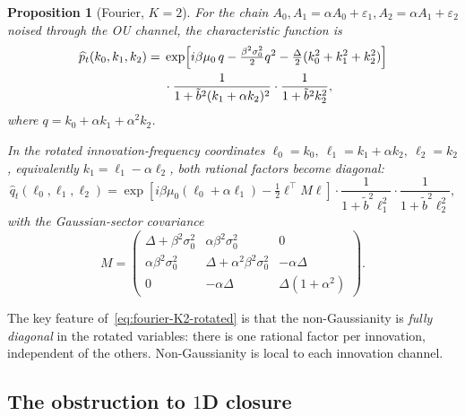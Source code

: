 \documentclass[11pt,a4paper]{article}
\theoremstyle{plainserif}
\newtheorem{proposition}[theorem]{Proposition}
\theoremstyle{definition}
\theoremstyle{remarkstyle}
\newcommand{\btilde}{\tilde{b}}
\newcommand{\hatfn}[1]{\widehat{#1}}
\begin{document}
\begin{proposition}[Fourier, $K{=}2$]
\label{prop:fourier-K2}
For the chain $A_0, A_1 = \alpha A_0+\varepsilon_1, A_2 = \alpha A_1+\varepsilon_2$
noised through the OU channel, the characteristic function is
\begin{align}
\hatfn{p}_t(k_0, k_1, k_2) =\;
&\exp\!\left[ i\beta\mu_0\, q - \tfrac{\beta^2\sigma_0^2}{2}q^2
            - \tfrac{\Delta}{2}(k_0^2+k_1^2+k_2^2) \right] \notag \\
&\cdot \frac{1}{1 + \btilde^2(k_1+\alpha k_2)^2}
\cdot \frac{1}{1 + \btilde^2 k_2^2},
\label{eq:fourier-K2-original}
\end{align}
where $q = k_0 + \alpha k_1 + \alpha^2 k_2$.

In the rotated innovation-frequency coordinates
$\ell_0 = k_0,\ \ell_1 = k_1 + \alpha k_2,\ \ell_2 = k_2$,
equivalently $k_1 = \ell_1 - \alpha\ell_2$, both rational factors become
diagonal:
\begin{equation}
\hatfn{q}_t(\ell_0,\ell_1,\ell_2) =
\exp\!\left[ i\beta\mu_0(\ell_0+\alpha\ell_1) - \tfrac{1}{2}\ell^\top M \ell\right]
\cdot \frac{1}{1+\btilde^2\ell_1^2}
\cdot \frac{1}{1+\btilde^2\ell_2^2},
\label{eq:fourier-K2-rotated}
\end{equation}
with the Gaussian-sector covariance
\begin{equation}
M = \begin{pmatrix}
\Delta + \beta^2\sigma_0^2 & \alpha\beta^2\sigma_0^2 & 0 \\
\alpha\beta^2\sigma_0^2 & \Delta + \alpha^2\beta^2\sigma_0^2 & -\alpha\Delta \\
0 & -\alpha\Delta & \Delta(1+\alpha^2)
\end{pmatrix}.
\label{eq:M}
\end{equation}
\end{proposition}

The key feature of~\eqref{eq:fourier-K2-rotated} is that the non-Gaussianity
is \emph{fully diagonal} in the rotated variables: there is one rational
factor per innovation, independent of the others. Non-Gaussianity is
local to each innovation channel.

\subsection{The obstruction to $1$D closure}
\end{document}

